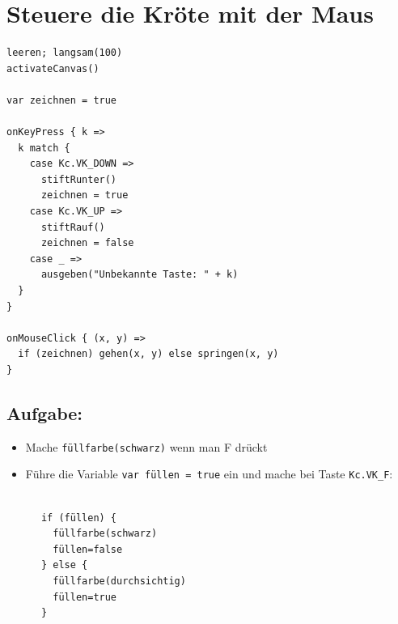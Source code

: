 \chapter{Steuere die Kröte mit der Maus}
\begin{multicols}{2}

\begin{lstlisting}[basicstyle={\ttfamily\fontsize{16}{19}\selectfont},numbers=none]
leeren; langsam(100)
activateCanvas()

var zeichnen = true

onKeyPress { k =>
  k match {
    case Kc.VK_DOWN => 
      stiftRunter()
      zeichnen = true
    case Kc.VK_UP => 
      stiftRauf()
      zeichnen = false
    case _ => 
      ausgeben("Unbekannte Taste: " + k)
  }
}

onMouseClick { (x, y) =>
  if (zeichnen) gehen(x, y) else springen(x, y)
}
\end{lstlisting}
        


\columnbreak


\section*{\color{BrickRed}Aufgabe:}


\begin{itemize}

\item {Mache \lstinline{füllfarbe(schwarz)} wenn man F drückt}
\item {Führe die Variable \lstinline{var füllen = true} ein und mache bei Taste \lstinline{Kc.VK_F}:}

\end{itemize}



\begin{lstlisting}[numbers=none]

      if (füllen) {
        füllfarbe(schwarz)
        füllen=false
      } else {
        füllfarbe(durchsichtig)
        füllen=true
      }
      
\end{lstlisting}
        
\end{multicols}

